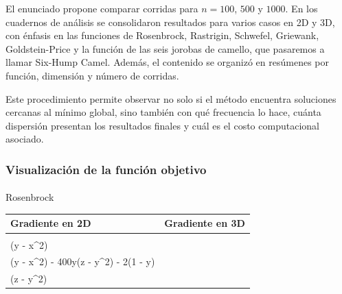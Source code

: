\documentclass[
  12pt,
  letterpaper,
  DIV=11,
  numbers=noendperiod]{scrartcl}
\makeatletter
\let\oldparagraph\paragraph
\renewcommand{\paragraph}{
    \@ifstar
      \xxxParagraphStar
      \xxxParagraphNoStar
  }
\newcommand{\xxxParagraphStar}[1]{\oldparagraph*{#1}\mbox{}}
\newcommand{\xxxParagraphNoStar}[1]{\oldparagraph{#1}\mbox{}}
\newcounter{none} %
\makeatother
\begin{document}
El enunciado propone comparar corridas para \(n = 100\), \(500\) y
\(1000\). En los cuadernos de análisis se consolidaron resultados para
varios casos en 2D y 3D, con énfasis en las funciones de Rosenbrock,
Rastrigin, Schwefel, Griewank, Goldstein-Price y la función de las seis
jorobas de camello, que pasaremos a llamar Six-Hump Camel. Además, el
contenido se organizó en resúmenes por función, dimensión y número de
corridas.

Este procedimiento permite observar no solo si el método encuentra
soluciones cercanas al mínimo global, sino también con qué frecuencia lo
hace, cuánta dispersión presentan los resultados finales y cuál es el
costo computacional asociado.

\subsubsection{Visualización de la función
objetivo}\label{visualizaciuxf3n-de-la-funciuxf3n-objetivo}

\paragraph{Rosenbrock}\label{rosenbrock}

{\def\LTcaptype{none} %
\begin{longtable}[]{@{}
  >{\raggedright\arraybackslash}p{}
  >{\raggedright\arraybackslash}p{}@{}}
\toprule\noalign{}
\begin{minipage}[b]{\linewidth}\raggedright
Gradiente en 2D
\end{minipage} & \begin{minipage}[b]{\linewidth}\raggedright
Gradiente en 3D
\end{minipage} \\
\midrule\noalign{}
\endhead
\bottomrule\noalign{}
\endlastfoot
\( \nabla f(x, y) = \begin{bmatrix} -400x(y - x^2) - 2(1 - x) \\ 200(y - x^2) \end{bmatrix} \)
&
\( \nabla f(x, y, z) = \begin{bmatrix} -400x(y - x^2) - 2(1 - x) \\ 200(y - x^2) - 400y(z - y^2) - 2(1 - y) \\ 200(z - y^2) \end{bmatrix} \) \\
\end{longtable}
}
\end{document}
